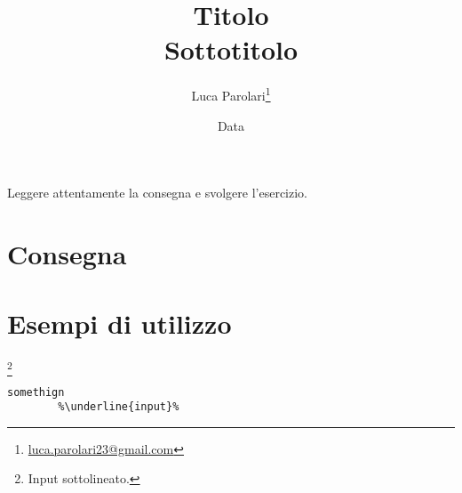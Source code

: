 \documentclass[addpoints,12pt,answers]{exam}
\author{Luca Parolari\footnote{\href{mailto:luca.parolari23@gmail.com}{luca.parolari23@gmail.com}}}
\begin{document}
    
    \title{Titolo\\ \large Sottotitolo}
    \date{Data}
    
    \maketitle
    
    Leggere attentamente la consegna e svolgere l'esercizio.
    
    \section{Consegna}
    \lipsum[1-1]
    
    \section{Esempi di utilizzo}
    \footnote{Input sottolineato.}
    
	\begin{lstlisting}[style=verbatim]
		somethign
		%\underline{input}%
	\end{lstlisting}
    
\end{document}
